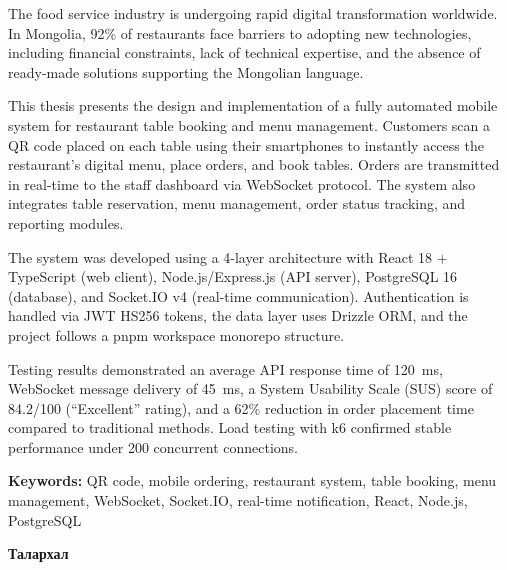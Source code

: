 \vspace{0.8cm}
{\normalsize
The food service industry is undergoing rapid digital transformation worldwide. In
Mongolia, 92\% of restaurants face barriers to adopting new technologies, including
financial constraints, lack of technical expertise, and the absence of ready-made
solutions supporting the Mongolian language.

This thesis presents the design and implementation of a fully automated mobile system
for restaurant table booking and menu management. Customers scan a QR code placed on
each table using their smartphones to instantly access the restaurant's digital menu,
place orders, and book tables. Orders are transmitted in real-time to the staff
dashboard via WebSocket protocol. The system also integrates table reservation, menu
management, order status tracking, and reporting modules.

The system was developed using a 4-layer architecture with React 18 + TypeScript
(web client), Node.js/Express.js (API server), PostgreSQL 16 (database), and
Socket.IO v4 (real-time communication). Authentication is handled via JWT HS256
tokens, the data layer uses Drizzle ORM, and the project follows a pnpm workspace
monorepo structure.

Testing results demonstrated an average API response time of 120~ms, WebSocket
message delivery of 45~ms, a System Usability Scale (SUS) score of 84.2/100
(``Excellent'' rating), and a 62\% reduction in order placement time compared to
traditional methods. Load testing with k6 confirmed stable performance under 200
concurrent connections.
}

\vspace{0.5cm}
{\small\textbf{Keywords:} QR code, mobile ordering, restaurant system, table booking,
menu management, WebSocket, Socket.IO, real-time notification, React, Node.js, PostgreSQL}
\clearpage

\thispagestyle{plain}
\begin{center}
{\large\bfseries Талархал}
\end{center}

